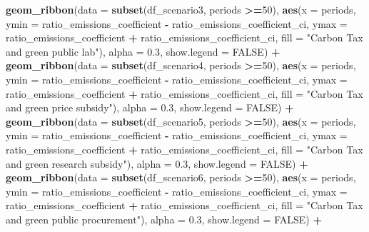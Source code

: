 \documentclass[
]{article}
\newenvironment{Shaded}{\begin{snugshade}}{\end{snugshade}}
\newcommand{\AttributeTok}[1]{\textcolor[rgb]{0.13,0.29,0.53}{#1}}
\newcommand{\ConstantTok}[1]{\textcolor[rgb]{0.56,0.35,0.01}{#1}}
\newcommand{\DecValTok}[1]{\textcolor[rgb]{0.00,0.00,0.81}{#1}}
\newcommand{\FloatTok}[1]{\textcolor[rgb]{0.00,0.00,0.81}{#1}}
\newcommand{\FunctionTok}[1]{\textcolor[rgb]{0.13,0.29,0.53}{\textbf{#1}}}
\newcommand{\NormalTok}[1]{#1}
\newcommand{\SpecialCharTok}[1]{\textcolor[rgb]{0.81,0.36,0.00}{\textbf{#1}}}
\newcommand{\StringTok}[1]{\textcolor[rgb]{0.31,0.60,0.02}{#1}}
\begin{document}
\begin{Shaded}
\begin{Highlighting}[]
  \FunctionTok{geom\_ribbon}\NormalTok{(}\AttributeTok{data =} \FunctionTok{subset}\NormalTok{(df\_scenario3, periods }\SpecialCharTok{\textgreater{}=}\DecValTok{50}\NormalTok{), }\FunctionTok{aes}\NormalTok{(}\AttributeTok{x =}\NormalTok{ periods, }\AttributeTok{ymin =}\NormalTok{ ratio\_emissions\_coefficient }\SpecialCharTok{{-}}\NormalTok{ ratio\_emissions\_coefficient\_ci, }\AttributeTok{ymax =}\NormalTok{ ratio\_emissions\_coefficient }\SpecialCharTok{+}\NormalTok{ ratio\_emissions\_coefficient\_ci, }\AttributeTok{fill =} \StringTok{"Carbon Tax and green public lab"}\NormalTok{), }\AttributeTok{alpha =} \FloatTok{0.3}\NormalTok{, }\AttributeTok{show.legend =} \ConstantTok{FALSE}\NormalTok{) }\SpecialCharTok{+}
  \FunctionTok{geom\_ribbon}\NormalTok{(}\AttributeTok{data =} \FunctionTok{subset}\NormalTok{(df\_scenario4, periods }\SpecialCharTok{\textgreater{}=}\DecValTok{50}\NormalTok{), }\FunctionTok{aes}\NormalTok{(}\AttributeTok{x =}\NormalTok{ periods, }\AttributeTok{ymin =}\NormalTok{ ratio\_emissions\_coefficient }\SpecialCharTok{{-}}\NormalTok{ ratio\_emissions\_coefficient\_ci, }\AttributeTok{ymax =}\NormalTok{ ratio\_emissions\_coefficient }\SpecialCharTok{+}\NormalTok{ ratio\_emissions\_coefficient\_ci, }\AttributeTok{fill =} \StringTok{"Carbon Tax and green price subsidy"}\NormalTok{), }\AttributeTok{alpha =} \FloatTok{0.3}\NormalTok{, }\AttributeTok{show.legend =} \ConstantTok{FALSE}\NormalTok{) }\SpecialCharTok{+}
  \FunctionTok{geom\_ribbon}\NormalTok{(}\AttributeTok{data =} \FunctionTok{subset}\NormalTok{(df\_scenario5, periods }\SpecialCharTok{\textgreater{}=}\DecValTok{50}\NormalTok{), }\FunctionTok{aes}\NormalTok{(}\AttributeTok{x =}\NormalTok{ periods, }\AttributeTok{ymin =}\NormalTok{ ratio\_emissions\_coefficient }\SpecialCharTok{{-}}\NormalTok{ ratio\_emissions\_coefficient\_ci, }\AttributeTok{ymax =}\NormalTok{ ratio\_emissions\_coefficient }\SpecialCharTok{+}\NormalTok{ ratio\_emissions\_coefficient\_ci, }\AttributeTok{fill =} \StringTok{"Carbon Tax and green research subsidy"}\NormalTok{), }\AttributeTok{alpha =} \FloatTok{0.3}\NormalTok{, }\AttributeTok{show.legend =} \ConstantTok{FALSE}\NormalTok{) }\SpecialCharTok{+}
  \FunctionTok{geom\_ribbon}\NormalTok{(}\AttributeTok{data =} \FunctionTok{subset}\NormalTok{(df\_scenario6, periods }\SpecialCharTok{\textgreater{}=}\DecValTok{50}\NormalTok{), }\FunctionTok{aes}\NormalTok{(}\AttributeTok{x =}\NormalTok{ periods, }\AttributeTok{ymin =}\NormalTok{ ratio\_emissions\_coefficient }\SpecialCharTok{{-}}\NormalTok{ ratio\_emissions\_coefficient\_ci, }\AttributeTok{ymax =}\NormalTok{ ratio\_emissions\_coefficient }\SpecialCharTok{+}\NormalTok{ ratio\_emissions\_coefficient\_ci, }\AttributeTok{fill =} \StringTok{"Carbon Tax and green public procurement"}\NormalTok{), }\AttributeTok{alpha =} \FloatTok{0.3}\NormalTok{, }\AttributeTok{show.legend =} \ConstantTok{FALSE}\NormalTok{) }\SpecialCharTok{+}

\end{Highlighting}
\end{Shaded}
\end{document}
